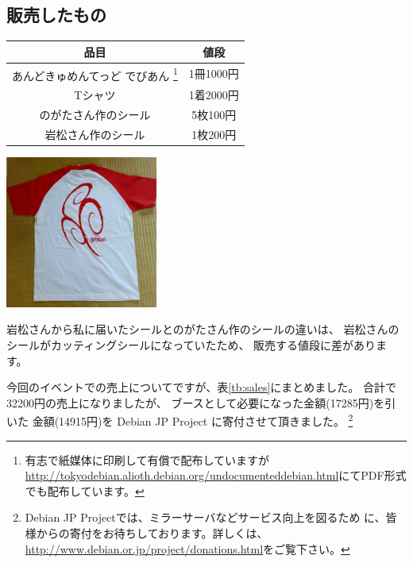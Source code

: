 \documentclass[mingoth,a4paper]{jsarticle}
\begin{document}
\subsection{販売したもの}

\begin{minipage}{0.5\hsize}
\begin{center}
 \begin{tabular}{|c|c|}
  \hline
  品目 & 値段 \\ \hline
  あんどきゅめんてっど でびあん
  \footnote{有志で紙媒体に印刷して有償で配布していますが\url{http://tokyodebian.alioth.debian.org/undocumenteddebian.html}にてPDF形式でも配布しています。} & 1冊1000円 \\ \hline
  Tシャツ & 1着2000円 \\ \hline
  のがたさん作のシール & 5枚100円 \\ \hline
  岩松さん作のシール & 1枚200円 \\ \hline
 \end{tabular} 
\end{center}
\end{minipage}
\begin{minipage}{0.5\hsize}
 \begin{center}
  \includegraphics[height=50mm]{image200808/t-shirts.jpg}
 \end{center}
\end{minipage}

\hspace{5mm}

岩松さんから私に届いたシールとのがたさん作のシールの違いは、
岩松さんのシールがカッティングシールになっていたため、
販売する値段に差があります。

今回のイベントでの売上についてですが、表\ref{tb:sales}にまとめました。
合計で32200円の売上になりましたが、
ブースとして必要になった金額(17285円)を引いた
金額(14915円)を Debian JP Project に寄付させて頂きました。
\footnote{Debian JP Projectでは、ミラーサーバなどサービス向上を図るため
に、皆様からの寄付をお待ちしております。詳しくは、
\url{http://www.debian.or.jp/project/donations.html}をご覧下さい。}
\end{document}
